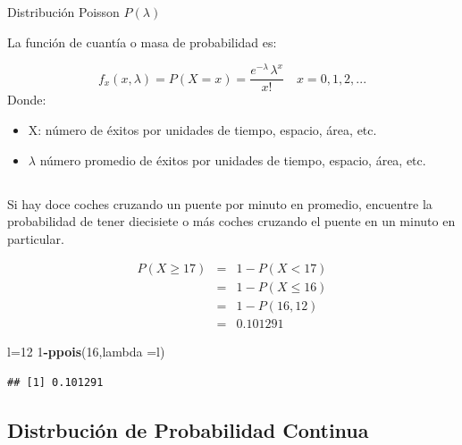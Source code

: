 \documentclass[
  ignorenonframetext,
]{beamer}
\newenvironment{Shaded}{\begin{snugshade}}{\end{snugshade}}
\newcommand{\DataTypeTok}[1]{\textcolor[rgb]{0.13,0.29,0.53}{#1}}
\newcommand{\DecValTok}[1]{\textcolor[rgb]{0.00,0.00,0.81}{#1}}
\newcommand{\KeywordTok}[1]{\textcolor[rgb]{0.13,0.29,0.53}{\textbf{#1}}}
\newcommand{\NormalTok}[1]{#1}
\newcommand{\OperatorTok}[1]{\textcolor[rgb]{0.81,0.36,0.00}{\textbf{#1}}}
\begin{document}
\begin{frame}{Distribución Poisson \(P(\lambda)\)}

La función de cuantía o masa de probabilidad es:

\[f_x(x,\lambda)=P(X=x)=\frac{e^{-\lambda\, }\lambda^x}{x!}\quad x=0,1,2,...\]
Donde:

\begin{itemize}
    \item X: número de éxitos por unidades de tiempo, espacio, área, etc.
    \item $\lambda$ número promedio de éxitos por unidades de tiempo, espacio, área, etc.
\end{itemize}

\end{frame}

\hypertarget{section-2}{%
\subsection{}\label{section-2}}

\begin{frame}[fragile]{}

\justifying Si hay doce coches cruzando un puente por minuto en
promedio, encuentre la probabilidad de tener diecisiete o más coches
cruzando el puente en un minuto en particular.

\[\begin{matrix}
P(X\geq 17) & = & 1 -P(X< 17)\\ 
 &  = &1 - P(X\leq  16) \\ 
 &  = &1- P(16,12) \\ 
 &  = & 0\mbox{.}101291
\end{matrix}\]

\begin{Shaded}
\begin{Highlighting}[]
\NormalTok{l=}\DecValTok{12}
\DecValTok{1}\OperatorTok{-}\KeywordTok{ppois}\NormalTok{(}\DecValTok{16}\NormalTok{,}\DataTypeTok{lambda =}\NormalTok{l)}
\end{Highlighting}
\end{Shaded}

\begin{verbatim}
## [1] 0.101291
\end{verbatim}

\end{frame}

\hypertarget{distrbuciuxf3n-de-probabilidad-continua}{%
\subsection{Distrbución de Probabilidad
Continua}\label{distrbuciuxf3n-de-probabilidad-continua}}
\end{document}
